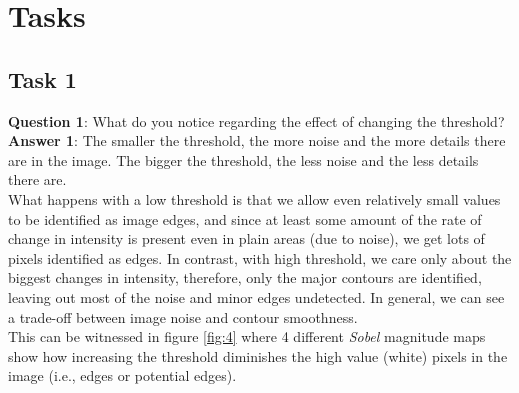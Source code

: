 \documentclass[lettersize,journal]{IEEEtran}
\begin{document}
\section{Tasks} \label{Tasks}
\subsection{Task 1}

\noindent\textbf{Question 1}: What do you notice regarding the effect of changing the threshold? \\

\noindent\textbf{Answer 1}: The smaller the threshold, the more noise and the more details there are in the image. The bigger the threshold, the less noise and the less details there are.\\

What happens with a low threshold is that we allow even relatively small values to be identified as image edges, and since at least some amount of the rate of change in intensity is present even in plain areas (due to noise), we get lots of pixels identified as edges. In contrast, with high threshold, we care only about the biggest changes in intensity, therefore, only the major contours are identified, leaving out most of the noise and minor edges undetected. In general, we can see a trade-off between image noise and contour smoothness.\\

This can be witnessed in figure \ref{fig:4} where 4 different \emph{Sobel} magnitude maps show how increasing the threshold diminishes the high value (white) pixels in the image (i.e., edges or potential edges).
\end{document}
